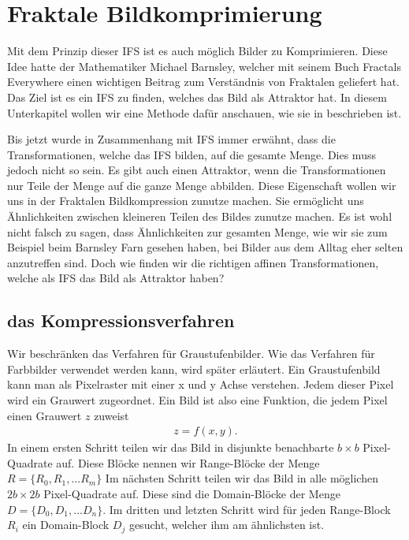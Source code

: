 %
%
%
\section{Fraktale Bildkomprimierung
\label{ifs:section:teil3}}
Mit dem Prinzip dieser IFS ist es auch möglich Bilder zu Komprimieren.
Diese Idee hatte der Mathematiker Michael Barnsley, welcher mit seinem Buch Fractals Everywhere einen wichtigen Beitrag zum Verständnis von Fraktalen geliefert hat.
Das Ziel ist es ein IFS zu finden, welches das Bild als Attraktor hat.
In diesem Unterkapitel wollen wir eine Methode dafür anschauen, wie sie in \cite{ifs:Rousseau2012} beschrieben ist.


Bis jetzt wurde in Zusammenhang mit IFS immer erwähnt, dass die Transformationen, welche das IFS bilden, auf die gesamte Menge.
Dies muss jedoch nicht so sein. 
Es gibt auch einen Attraktor, wenn die Transformationen nur Teile der Menge auf die ganze Menge abbilden.
Diese Eigenschaft wollen wir uns in der Fraktalen Bildkompression zunutze machen.
Sie ermöglicht uns Ähnlichkeiten zwischen kleineren Teilen des Bildes zunutze machen.
Es ist wohl nicht falsch zu sagen, dass Ähnlichkeiten zur gesamten Menge, wie wir sie zum Beispiel beim Barnsley Farn gesehen haben, bei Bilder aus dem Alltag eher selten anzutreffen sind.
Doch wie finden wir die richtigen affinen Transformationen, welche als IFS das Bild als Attraktor haben?

\subsection{das Kompressionsverfahren
\label{ifs:subsection:malorum}}
Wir beschränken das Verfahren für Graustufenbilder. Wie das Verfahren für Farbbilder verwendet werden kann, wird später erläutert.
Ein Graustufenbild kann man als Pixelraster mit einer x und y Achse verstehen.
Jedem dieser Pixel wird ein Grauwert zugeordnet.
Ein Bild ist also eine Funktion, die jedem Pixel einen Grauwert $z$ zuweist
\begin{align*}
	z = f(x,y).
\end{align*} 
In einem ersten Schritt teilen wir das Bild in disjunkte benachbarte $b \times b$ Pixel-Quadrate auf. Diese Blöcke nennen wir Range-Blöcke der Menge $R=\{R_0,R_1,...R_m\}$
Im nächsten Schritt teilen wir das Bild in alle möglichen $2b \times 2b$ Pixel-Quadrate auf. Diese sind die Domain-Blöcke der Menge $D = \{D_0,D_1,...D_n\}$. 
Im dritten und letzten Schritt wird für jeden Range-Block $R_i$ ein Domain-Block $D_j$ gesucht, welcher ihm am ähnlichsten ist.

